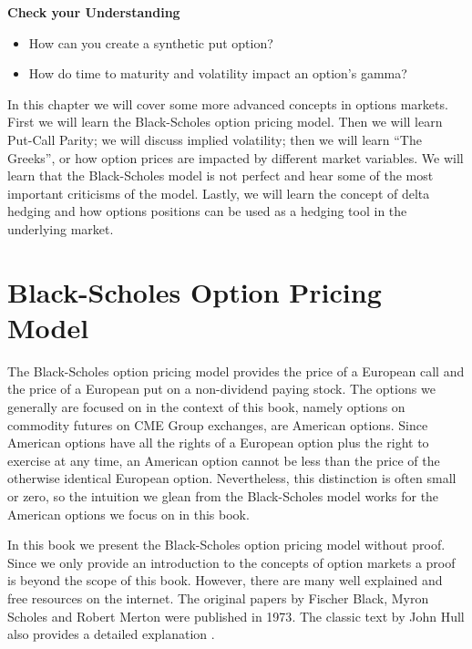 \documentclass[
]{book}
\begin{document}
\textbf{Check your Understanding}

\begin{itemize}
\item
  How can you create a synthetic put option?
\item
  How do time to maturity and volatility impact an option's gamma?
\end{itemize}

In this chapter we will cover some more advanced concepts in options markets. First we will learn the Black-Scholes option pricing model. Then we will learn Put-Call Parity; we will discuss implied volatility; then we will learn ``The Greeks'', or how option prices are impacted by different market variables. We will learn that the Black-Scholes model is not perfect and hear some of the most important criticisms of the model. Lastly, we will learn the concept of delta hedging and how options positions can be used as a hedging tool in the underlying market.

\hypertarget{black-scholes-option-pricing-model}{%
\section{Black-Scholes Option Pricing Model}\label{black-scholes-option-pricing-model}}

The Black-Scholes option pricing model provides the price of a European call and the price of a European put on a non-dividend paying stock. The options we generally are focused on in the context of this book, namely options on commodity futures on CME Group exchanges, are American options. Since American options have all the rights of a European option plus the right to exercise at any time, an American option cannot be less than the price of the otherwise identical European option. Nevertheless, this distinction is often small or zero, so the intuition we glean from the Black-Scholes model works for the American options we focus on in this book.

In this book we present the Black-Scholes option pricing model without proof. Since we only provide an introduction to the concepts of option markets a proof is beyond the scope of this book. However, there are many well explained and free resources on the internet. The original papers by Fischer Black, Myron Scholes and Robert Merton were published in 1973\citep{black_pricing_1973, merton_theory_1973}. The classic text by John Hull also provides a detailed explanation \citep{hull2017}.
\end{document}
